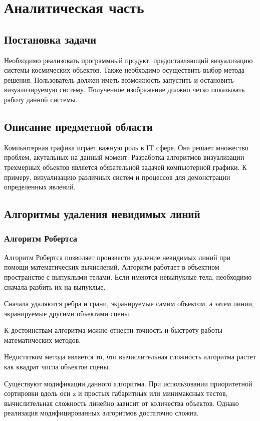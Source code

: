 \chapter{Аналитическая часть}

\section{Постановка задачи}
Необходимо реализовать программный продукт, предоставляющий визуализацию системы космических объектов.
Также необходимо осуществить выбор метода решения. Пользователь должен иметь возможность запустить и остановить визуализируемую систему. Полученное изображение должно четко показывать работу данной системы.

\section {Описание предметной области}
Компьютерная графика играет важную роль в IT сфере. Она решает множество проблем, акутальных на данный момент.
Разработка алгоритмов визуализации трехмерных объектов является обязательной задачей компьютерной графики.
К примеру, визуализацию различных
систем и процессов для демонстрации определенных явлений.


\section {Алгоритмы удаления невидимых линий}

\subsection{Алгоритм Робертса}

Алгоритм Робертса позволяет произвести удаление невидимых линий при помощи математических вычислений. Алгоритм работает в объектном пространстве с выпуклыми телами. Если имеются невыпуклые тела, необходимо сначала разбить их на выпуклые.

Сначала удаляются ребра и грани, экранируемые самим объектом, а затем линии, экранируемые другими объектами сцены.

К достоинствам алгоритма можно отнести точность и быстроту работы математических методов.

Недостатком метода является то, что вычислительная сложность алгоритма растет как квадрат числа объектов сцены.

Существуют модификации данного алгоритма. При использовании приоритетной сортировки вдоль оси z и простых габаритных или минимаксных тестов, вычислительная сложность линейно зависит от количества объектов. Однако реализация модифицированных алгоритмов достаточно сложна.


